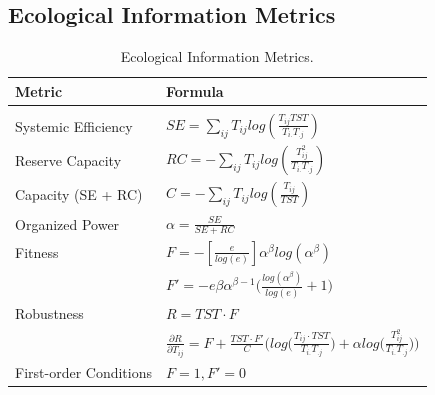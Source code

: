 \documentclass{article}
\begin{document}
\subsection{Ecological Information Metrics}

\begin{table}[H]
\caption{Ecological Information Metrics.}
\label{IOmetrics}
\vskip 0.15in
\begin{center}
\begin{sc}
\begin{tabular}{ l l}
\hline

Metric &  Formula  \\
\hline
&  \\
Systemic Efficiency
  & $SE = \displaystyle\sum_{ij}{T_{ij}} log(\frac{T_{ij}TST}{T_{i.}T_{.j}}) $ 
  \\[.25in]

Reserve Capacity 
  & $RC = - \displaystyle\sum_{ij}{T_{ij}} log(\frac{T_{ij}^2}{T_{i.}T_{.j}}) $ 
 \\[.25in]
  
Capacity (SE + RC)
  & $C = -\displaystyle\sum_{ij}{T_{ij}} log(\frac{T_{ij}}{TST}) $ 
   \\[.25in]

Organized Power  & $\alpha=\frac{SE}{SE + RC}$  \\[.25in]

Fitness
 
 & $F = -[\frac{e}{log(e)}] 
    \alpha^\beta log(\alpha^\beta)$ \\[.25in]

& $F' = -e \beta \alpha^{\beta - 1}
\bigg(
    \frac{log(\alpha^\beta)}  {log(e)} 
        + 1 
\bigg)$         \\[.25in]

 


Robustness & $R = TST \cdot F$\\[.25in]


& $\frac{\partial R}{\partial T_{ij}} = F + \frac{TST \cdot F'}{C}
\bigg(log \big(\frac{T_{ij} \cdot TST}{T_{i.} T_{.j}} \big) 
+ \alpha log \big( \frac{T^{2}_{ij}}{T_{i.}T_{.j}} 
\big) \bigg)$ \\[.25in]





First-order Conditions & $F = 1, F'=0$ \\[.25in]




\end{tabular}
\end{sc}
\end{center}
\vskip -0.1in
\end{table}
\end{document}
